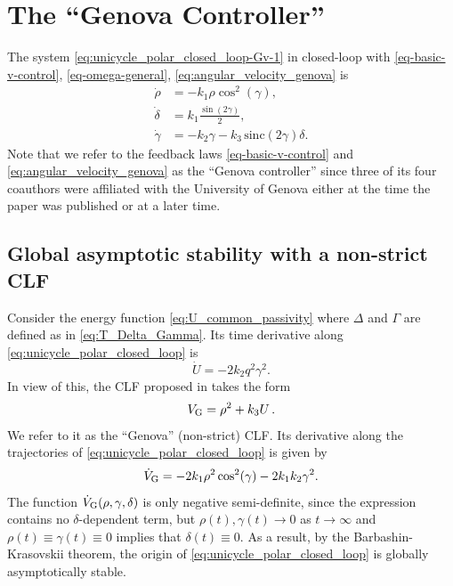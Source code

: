 \documentclass[journal,twoside,web]{ieeecolor}
\theoremstyle{definition}
\begin{document}
\section{The ``Genova Controller''}

\label{sec-Genova}
The system 
\eqref{eq:unicycle_polar_closed_loop-Gv-1} in closed-loop with  \eqref{eq-basic-v-control}, \eqref{eq-omega-general},  \eqref{eq:angular_velocity_genova} is
\begin{subequations}
\label{eq:unicycle_polar_closed_loop}
\begin{align}
\dot{\rho} &=  -k_1 \rho \cos^2(\gamma),  \\
\dot{\delta} &=  k_1 \frac{\sin(2\gamma)}{2}, \label{eq:delta_dot_genova}\\
\dot{\gamma} &= -k_2 \gamma -
k_3 \,\mbox{sinc}(2\gamma)
\delta.\label{eq:gamma_dot_genova}
\end{align}
\end{subequations}
Note that we refer to the feedback laws \eqref{eq-basic-v-control} and \eqref{eq:angular_velocity_genova} as the ``Genova controller'' \cite{aicardi1995} since three of its four coauthors were affiliated with the University of Genova either at the time the paper was published or at a later time. 

\subsection{Global asymptotic stability with a non-strict CLF}

Consider the energy function \eqref{eq:U_common_passivity} where $\Delta$ and $\Gamma$ are defined as in \eqref{eq:T_Delta_Gamma}.
Its time derivative along \eqref{eq:unicycle_polar_closed_loop} is  
\begin{equation}
\dot{U} = - 2 k_2 q^2 \gamma^2. \label{eq:dot_U_polynomial}
\end{equation}
In view of this,
the CLF proposed in \cite{aicardi1995} takes the form
\begin{equation}
V_{\rm G} = \rho^2 + k_3 U \,. \label{eq:CLF_aicardi}
\end{equation}
We refer to it as the ``Genova'' (non-strict) CLF.
Its derivative along the trajectories of \eqref{eq:unicycle_polar_closed_loop} is given by
\begin{align}
\dot{V}_{\rm G} = -2 k_1 \rho^2\cos^2(\gamma) - 2 k_1k_2\gamma^2. \label{eq:V_dot_aicardi}
\end{align}
The function $\dot{V}_{\rm G}(\rho,\gamma,\delta)$ is only negative semi-definite, since the expression contains no $\delta$-dependent term, but $\rho(t),\gamma(t) \rightarrow 0$ as $t\rightarrow \infty$ and $\rho(t)\equiv\gamma(t)\equiv 0$ implies that $\delta(t)\equiv 0$. As a result, by 
the Barbashin-Krasovskii theorem, the origin of \eqref{eq:unicycle_polar_closed_loop} is globally asymptotically stable.
\end{document}
